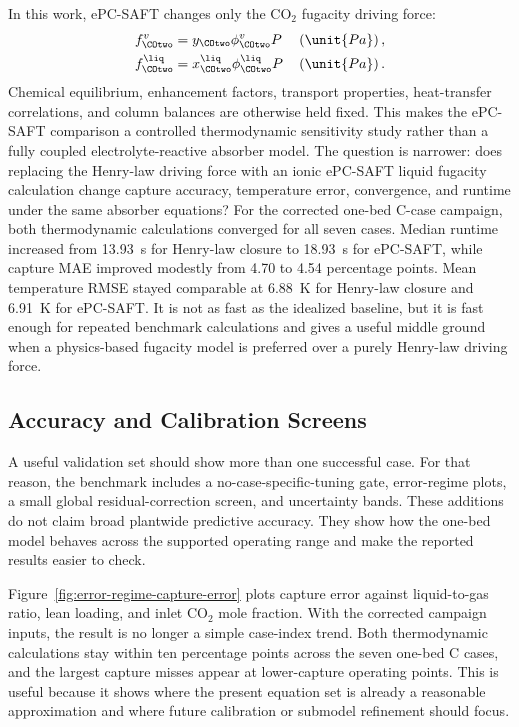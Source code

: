         In this work, ePC-SAFT changes only the CO$_2$ fugacity driving force:
        \begin{align}
            f_{\COtwo}^{v} &= y_{\COtwo}\phi_{\COtwo}^{v}P
            && \left(\unit{Pa}\right),\\
            f_{\COtwo}^{\liq} &= x_{\COtwo}^{\liq}\phi_{\COtwo}^{\liq}P
            && \left(\unit{Pa}\right).
        \end{align}
        Chemical equilibrium, enhancement factors, transport properties, heat-transfer correlations, and column balances are otherwise held fixed. This makes the ePC-SAFT comparison a controlled thermodynamic sensitivity study rather than a fully coupled electrolyte-reactive absorber model. The question is narrower: does replacing the Henry-law driving force with an ionic ePC-SAFT liquid fugacity calculation change capture accuracy, temperature error, convergence, and runtime under the same absorber equations? For the corrected one-bed C-case campaign, both thermodynamic calculations converged for all seven cases. Median runtime increased from \SI{13.93}{s} for Henry-law closure to \SI{18.93}{s} for ePC-SAFT, while capture MAE improved modestly from 4.70 to 4.54 percentage points. Mean temperature RMSE stayed comparable at \SI{6.88}{K} for Henry-law closure and \SI{6.91}{K} for ePC-SAFT. It is not as fast as the idealized baseline, but it is fast enough for repeated benchmark calculations and gives a useful middle ground when a physics-based fugacity model is preferred over a purely Henry-law driving force.

        \FloatBarrier

    \subsection{Accuracy and Calibration Screens}
        A useful validation set should show more than one successful case. For that reason, the benchmark includes a no-case-specific-tuning gate, error-regime plots, a small global residual-correction screen, and uncertainty bands. These additions do not claim broad plantwide predictive accuracy. They show how the one-bed model behaves across the supported operating range and make the reported results easier to check.

        Figure~\ref{fig:error-regime-capture-error} plots capture error against liquid-to-gas ratio, lean loading, and inlet CO$_2$ mole fraction. With the corrected campaign inputs, the result is no longer a simple case-index trend. Both thermodynamic calculations stay within ten percentage points across the seven one-bed C cases, and the largest capture misses appear at lower-capture operating points. This is useful because it shows where the present equation set is already a reasonable approximation and where future calibration or submodel refinement should focus.

